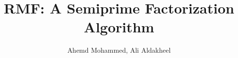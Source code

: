 \documentclass[a4paper]{article}
\begin{document}
\title{RMF: A Semiprime Factorization Algorithm}

\author{Ahemd Mohammed, Ali Aldakheel}

\maketitle 
\end{document}
